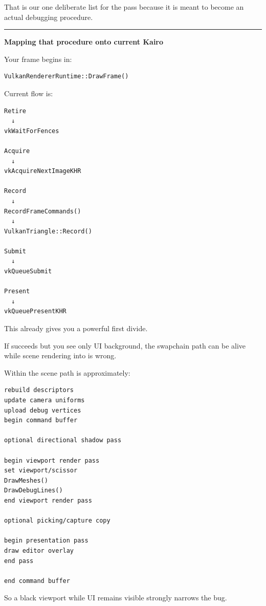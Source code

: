 That is our one deliberate list for the pass because it is meant to become an actual debugging procedure.

\begin{center}\rule{0.5\linewidth}{0.5pt}\end{center}

\textbf{Mapping that procedure onto current Kairo}

Your frame begins in:

\begin{verbatim}
VulkanRendererRuntime::DrawFrame()
\end{verbatim}

Current flow is:

\begin{verbatim}
Retire
  ↓
vkWaitForFences

Acquire
  ↓
vkAcquireNextImageKHR

Record
  ↓
RecordFrameCommands()
  ↓
VulkanTriangle::Record()

Submit
  ↓
vkQueueSubmit

Present
  ↓
vkQueuePresentKHR
\end{verbatim}

This already gives you a powerful first divide.

If  succeeds but you see only UI background, the swapchain path can be alive while scene rendering into  is wrong.

Within  the scene path is approximately:

\begin{verbatim}
rebuild descriptors
update camera uniforms
upload debug vertices
begin command buffer

optional directional shadow pass

begin viewport render pass
set viewport/scissor
DrawMeshes()
DrawDebugLines()
end viewport render pass

optional picking/capture copy

begin presentation pass
draw editor overlay
end pass

end command buffer
\end{verbatim}

So a black viewport while UI remains visible strongly narrows the bug.

